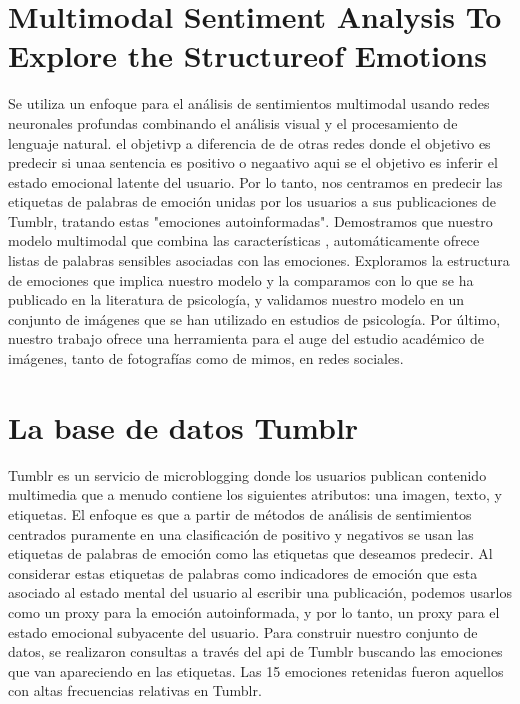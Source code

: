\documentclass[conference]{IEEEtran}
\begin{document}
\section{Multimodal Sentiment Analysis To Explore the Structureof Emotions}


Se utiliza un enfoque para el análisis de sentimientos multimodal usando redes neuronales profundas combinando el análisis visual y el procesamiento de lenguaje natural. el objetivp a diferencia de de otras redes donde el objetivo es predecir si unaa sentencia es positivo o negaativo aqui se el objetivo es inferir el estado emocional latente del usuario. Por lo tanto, nos centramos en predecir las etiquetas de palabras de emoción unidas por los usuarios a sus publicaciones de Tumblr, tratando estas "emociones autoinformadas". Demostramos que nuestro modelo multimodal que combina las características  , automáticamente ofrece listas de palabras sensibles asociadas con las emociones. Exploramos la estructura de emociones que implica nuestro modelo y la comparamos con lo que se ha publicado en la literatura de psicología, y validamos nuestro modelo en un conjunto de imágenes que se han utilizado en estudios de psicología. Por último, nuestro trabajo ofrece una herramienta para el auge del estudio académico de imágenes, tanto de fotografías como de mimos, en redes sociales.


\section{La base de datos Tumblr}


Tumblr es un servicio de microblogging donde los usuarios publican contenido multimedia  que a menudo contiene los siguientes atributos: una imagen, texto,
y etiquetas. El enfoque es que a partir de métodos de análisis de sentimientos centrados  puramente en una clasificación de positivo y negativos se usan las etiquetas de palabras de emoción como las etiquetas que deseamos predecir. Al considerar estas etiquetas de palabras como indicadores de emoción que esta asociado al estado mental del usuario al escribir una publicación, podemos usarlos como un proxy para la emoción autoinformada, y
por lo tanto, un proxy para el estado emocional subyacente del usuario.
Para construir nuestro conjunto de datos, se realizaron consultas a través del api de Tumblr buscando las  emociones que van apareciendo en las etiquetas. Las 15 emociones
retenidas fueron aquellos con altas frecuencias relativas en Tumblr.
\end{document}
